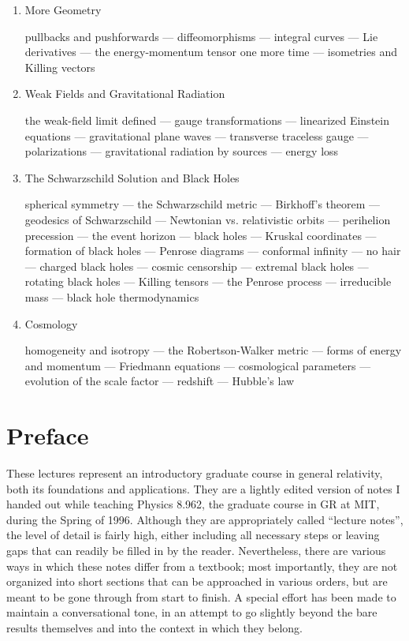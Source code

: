 \begin{enumerate}
\item{More Geometry}

pullbacks and pushforwards --- diffeomorphisms --- integral
  curves --- Lie derivatives --- the energy-momentum tensor one
  more time --- isometries and Killing vectors

\item{Weak Fields and Gravitational Radiation}

the weak-field limit defined --- gauge transformations --- linearized
  Einstein equations --- gravitational plane waves --- transverse
  traceless gauge --- polarizations --- gravitational radiation by
  sources --- energy loss

\item{The Schwarzschild Solution and Black Holes}

spherical symmetry --- the Schwarzschild metric ---
  Birkhoff's theorem --- geodesics of Schwarzschild ---
  Newtonian vs. relativistic orbits --- perihelion precession ---
  the event horizon --- black holes --- Kruskal coordinates ---
  formation of black holes --- Penrose diagrams --- conformal infinity ---
  no hair --- charged black holes --- cosmic censorship --- extremal
  black holes --- rotating black holes --- Killing tensors --- the
  Penrose process --- irreducible mass --- black hole thermodynamics

\item{Cosmology}

homogeneity and isotropy --- the Robertson-Walker metric ---
  forms of energy and momentum --- Friedmann equations ---
  cosmological parameters --- evolution of the scale factor ---
  redshift --- Hubble's law

\end{enumerate}

\eject

\section*{Preface}

These lectures represent an introductory graduate course in general
relativity, both its foundations and applications.  They are a lightly
edited version of notes I handed out while teaching Physics
8.962, the graduate course in GR at MIT, during the Spring of 1996.
Although they are appropriately called ``lecture notes'', the level
of detail is fairly high, either including all necessary steps or
leaving gaps that can readily be filled in by the reader.  Nevertheless,
there are various ways in which these notes differ from a textbook;
most importantly, they are not organized into short sections that
can be approached in various orders, but are meant to be gone through from
start to finish.  A special effort has been made to maintain a 
conversational tone, in an attempt to go slightly beyond the bare
results themselves and into the context in which they belong.

